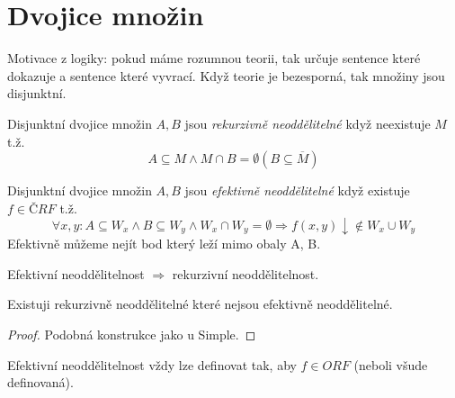 \section{\texorpdfstring{Dvojice množin}{Dvojice množin}}
\vspace{5mm}
\large

\begin{note}
	Motivace z logiky: pokud máme rozumnou teorii, tak určuje sentence které dokazuje a sentence které vyvrací.
	Když teorie je bezesporná, tak množiny jsou disjunktní.
\end{note}

\begin{definition}
	Disjunktní dvojice množin $A, B$ jsou \emph{rekurzivně neoddělitelné} když neexistuje $M$ t.ž.
	\[ A \subseteq M \land M \cap B = \emptyset (B \subseteq \overline{M}) \]
\end{definition}

\begin{definition}
	Disjunktní dvojice množin $A, B$ jsou \emph{efektivně neoddělitelné} když existuje $f \in ČRF$ t.ž.
	\[ \forall x, y: A \subseteq W_x \land B \subseteq W_y \land W_x \cap W_y = \emptyset \Rightarrow f(x, y) \downarrow \notin W_x \cup W_y \]
	Efektivně můžeme nejít bod který leží mimo obaly A, B.
\end{definition}

\begin{note}
	Efektivní neoddělitelnost $\Rightarrow$ rekurzivní neoddělitelnost.
\end{note}

\begin{theorem}
	Existuji rekurzivně neoddělitelné které nejsou efektivně neoddělitelné.
\end{theorem}
\begin{proof}
	Podobná konstrukce jako u Simple.
\end{proof}

\begin{note}
	Efektivní neoddělitelnost vždy lze definovat tak, aby $f \in ORF$ (neboli všude definovaná).
\end{note}

